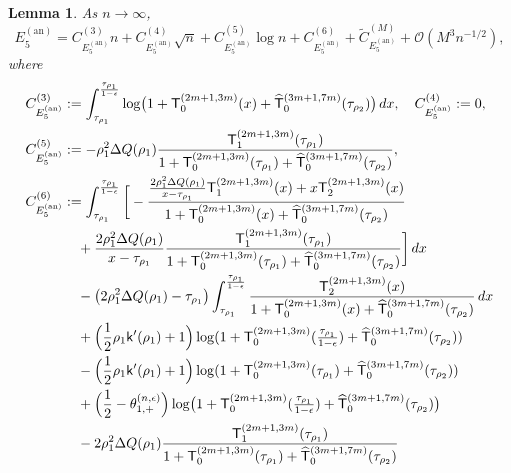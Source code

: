 \documentclass[a4paper]{article}
\newtheorem{lemma}[theorem]{Lemma}
\numberwithin{equation}{section}
\begin{document}
\begin{lemma}\label{lemma:asymptotic expansion E5 annulus}
As $n\to\infty$,
\[
    E_{5}^{(\mathrm{an})}
    =
    C_{ E_5^{(\mathrm{an})}}^{(3)} n
    +
    C_{ E_5^{(\mathrm{an})}}^{(4)} \sqrt{n}
    +
    C_{ E_5^{(\mathrm{an})}}^{(5)} \log n
    +
    C_{ E_5^{(\mathrm{an})}}^{(6)}
    +
    \widetilde{C}_{ E_5^{(\mathrm{an})}}^{(M)} 
    +
    \mathcal{O}(M^3n^{-1/2}), 
\]  
where 
\begin{align*}
C_{ E_5^{(\mathrm{an})}}^{(3)} 
&:=
\int_{\tau_{\rho_1}}^{\frac{\tau_{\rho_1}}{1-\epsilon}}
\log\bigl(1+\mathsf{T}_{0}^{(2m+1,3m)}(x)+\widehat{\mathsf{T}}_0^{(3m+1,7m)}(\tau_{\rho_2})\bigr)\,dx,
\quad
C_{ E_5^{(\mathrm{an})}}^{(4)} 
:=0,
\\
C_{ E_5^{(\mathrm{an})}}^{(5)} 
&:=
-
\rho_1^2\Delta Q(\rho_1)
\frac{\mathsf{T}_{1}^{(2m+1,3m)}(\tau_{\rho_1})}{1+\mathsf{T}_{0}^{(2m+1,3m)}(\tau_{\rho_1})+\widehat{\mathsf{T}}_{0}^{(3m+1,7m)}(\tau_{\rho_2})},
\\
C_{ E_5^{(\mathrm{an})}}^{(6)} 
&:=
\int_{\tau_{\rho_1}}^{\frac{\tau_{\rho_1}}{1-\epsilon}}
\bigg[-\frac{\frac{2\rho_1^2\Delta Q(\rho_1)}{x-\tau_{\rho_1}}\mathsf{T}_{1}^{(2m+1,3m)}(x)+x\mathsf{T}_{2}^{(2m+1,3m)}(x)}{1+\mathsf{T}_{0}^{(2m+1,3m)}(x)+\widehat{\mathsf{T}}_{0}^{(3m+1,7m)}(\tau_{\rho_2})}
\\
&\quad 
+\frac{2\rho_1^2\Delta Q(\rho_1)}{x-\tau_{\rho_1}}\frac{\mathsf{T}_{1}^{(2m+1,3m)}(\tau_{\rho_1})}{1+\mathsf{T}_{0}^{(2m+1,3m)}(\tau_{\rho_1})+\widehat{\mathsf{T}}_{0}^{(3m+1,7m)}(\tau_{\rho_2})}\bigg]\,dx
\\
&\quad
-\bigl(2\rho_1^2\Delta Q(\rho_1)-\tau_{\rho_1}\bigr)
\int_{\tau_{\rho_1}}^{\frac{\tau_{\rho_1}}{1-\epsilon}}
\frac{\mathsf{T}_{2}^{(2m+1,3m)}(x)}{1+\mathsf{T}_{0}^{(2m+1,3m)}(x)+\widehat{\mathsf{T}}_{0}^{(3m+1,7m)}(\tau_{\rho_2})}\,dx
\\
&\quad
+\Bigl(\frac{1}{2}\rho_1\mathsf{k}'(\rho_1)+1\Bigr)
\log(1+\mathsf{T}_0^{(2m+1,3m)}(\tfrac{\tau_{\rho_1}}{1-\epsilon})+\widehat{\mathsf{T}}_{0}^{(3m+1,7m)}(\tau_{\rho_2}))
\\
&\quad
-\Bigl(\frac{1}{2}\rho_1\mathsf{k}'(\rho_1)+1\Bigr)
\log(1+\mathsf{T}_0^{(2m+1,3m)}(\tau_{\rho_1})+\widehat{\mathsf{T}}_{0}^{(3m+1,7m)}(\tau_{\rho_2}))
\\
&\quad
+\Bigl(\frac{1}{2}-\theta_{1,+}^{(n,\epsilon)}\Bigr)\log\bigl(1+\mathsf{T}_{0}^{(2m+1,3m)}(\tfrac{\tau_{\rho_1}}{1-\epsilon})+\widehat{\mathsf{T}}_0^{(3m+1,7m)}(\tau_{\rho_2})\bigr)
\\
&\quad 
-
2\rho_1^2\Delta Q(\rho_1)
\frac{\mathsf{T}_{1}^{(2m+1,3m)}(\tau_{\rho_1})}{1+\mathsf{T}_{0}^{(2m+1,3m)}(\tau_{\rho_1})+\widehat{\mathsf{T}}_{0}^{(3m+1,7m)}(\tau_{\rho_2})}

\end{align*}
\end{lemma}
\end{document}
